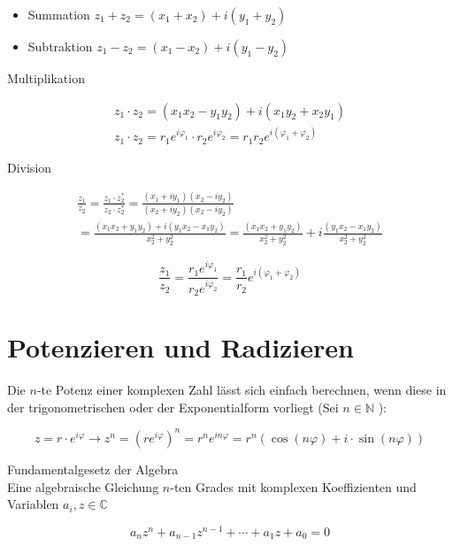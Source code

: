 \documentclass[10pt]{article}
\begin{document}
\begin{itemize}
  \item Summation $z_{1}+z_{2}=\left(x_{1}+x_{2}\right)+i\left(y_{1}+y_{2}\right)$
  \item Subtraktion $z_{1}-z_{2}=\left(x_{1}-x_{2}\right)+i\left(y_{1}-y_{2}\right)$
\end{itemize}

Multiplikation

$$
\begin{gathered}
z_{1} \cdot z_{2}=\left(x_{1} x_{2}-y_{1} y_{2}\right)+i\left(x_{1} y_{2}+x_{2} y_{1}\right) \\
z_{1} \cdot z_{2}=r_{1} e^{i \varphi_{1}} \cdot r_{2} e^{i \varphi_{2}}=r_{1} r_{2} e^{i\left(\varphi_{1}+\varphi_{2}\right)}
\end{gathered}
$$

Division

$$
\begin{gathered}
\frac{z_{1}}{z_{2}}=\frac{z_{1} \cdot z_{2}^{*}}{z_{2} \cdot z_{2}^{*}}=\frac{\left(x_{1}+i y_{1}\right)\left(x_{2}-i y_{2}\right)}{\left(x_{2}+i y_{2}\right)\left(x_{2}-i y_{2}\right)} \\
=\frac{\left(x_{1} x_{2}+y_{1} y_{2}\right)+i\left(y_{1} x_{2}-x_{1} y_{2}\right)}{x_{2}^{2}+y_{2}^{2}}=\frac{\left(x_{1} x_{2}+y_{1} y_{2}\right)}{x_{2}^{2}+y_{2}^{2}}+i \frac{\left(y_{1} x_{2}-x_{1} y_{2}\right)}{x_{2}^{2}+y_{2}^{2}}
\end{gathered}
$$

$$
\frac{z_{1}}{z_{2}}=\frac{r_{1} e^{i \varphi_{1}}}{r_{2} e^{i \varphi_{2}}}=\frac{r_{1}}{r_{2}} e^{i\left(\varphi_{1}+\varphi_{2}\right)}
$$

\section*{Potenzieren und Radizieren}
Die $n$-te Potenz einer komplexen Zahl lässt sich einfach berechnen, wenn diese in der trigonometrischen oder der Exponentialform vorliegt (Sei $n \in \mathbb{N}$ ):

$$
z=r \cdot e^{i \varphi} \rightarrow z^{n}=\left(r e^{i \varphi}\right)^{n}=r^{n} e^{i n \varphi}=r^{n}(\cos (n \varphi)+i \cdot \sin (n \varphi))
$$

Fundamentalgesetz der Algebra\\
Eine algebraische Gleichung $n$-ten Grades mit komplexen Koeffizienten und Variablen $a_{i}, z \in \mathbb{C}$

$$
a_{n} z^{n}+a_{n-1} z^{n-1}+\cdots+a_{1} z+a_{0}=0
$$
\end{document}
